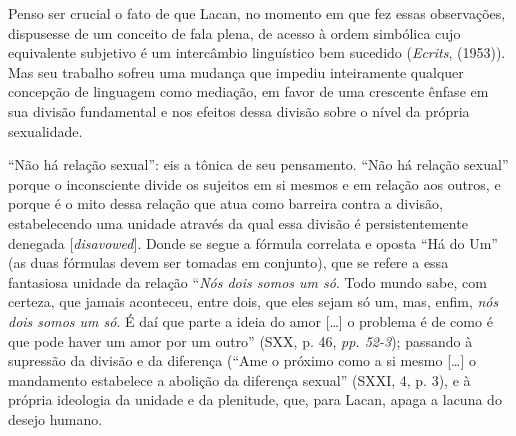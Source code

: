 Penso ser crucial o fato de que Lacan, no momento em que fez essas
observações, dispusesse de um conceito de fala plena, de acesso à ordem
simbólica cujo equivalente subjetivo é um intercâmbio linguístico bem
sucedido (\emph{Ecrits}, (1953)). Mas seu trabalho sofreu uma mudança
que impediu inteiramente qualquer concepção de linguagem como mediação,
em favor de uma crescente ênfase em sua divisão fundamental e nos
efeitos dessa divisão sobre o nível da própria sexualidade.

``Não há relação sexual'': eis a tônica de seu pensamento. ``Não há
relação sexual'' porque o inconsciente divide os sujeitos em si mesmos e
em relação aos outros, e porque é o mito dessa relação que atua como
barreira contra a divisão, estabelecendo uma unidade através da qual
essa divisão é persistentemente denegada {[}\emph{disavowed}{]}. Donde
se segue a fórmula correlata e oposta ``Há do Um'' (as duas fórmulas
devem ser tomadas em conjunto), que se refere a essa fantasiosa unidade
da relação ``\emph{Nós dois somos um só}. Todo mundo sabe, com certeza,
que jamais aconteceu, entre dois, que eles sejam só um, mas, enfim,
\emph{nós dois somos um só}. É daí que parte a ideia do amor {[}\ldots{}{]} o
problema é de como é que pode haver um amor por um outro'' (SXX, p. 46,
\emph{pp. 52-3}); passando à supressão da divisão e da diferença (``Ame
o próximo como a si mesmo {[}\ldots{}{]} o mandamento estabelece a abolição
da diferença sexual'' (SXXI, 4, p. 3), e à própria ideologia da unidade
e da plenitude, que, para Lacan, apaga a lacuna do desejo humano.

